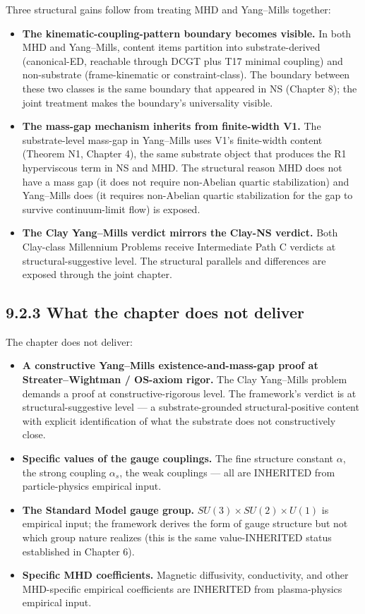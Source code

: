 \documentclass[11pt]{book}
\begin{document}
Three structural gains follow from treating MHD and Yang–Mills together:

\begin{itemize}
\item \textbf{The kinematic-coupling-pattern boundary becomes visible.} In both MHD and Yang–Mills, content items partition into substrate-derived (canonical-ED, reachable through DCGT plus T17 minimal coupling) and non-substrate (frame-kinematic or constraint-class). The boundary between these two classes is the same boundary that appeared in NS (Chapter 8); the joint treatment makes the boundary's universality visible.
\item \textbf{The mass-gap mechanism inherits from finite-width V1.} The substrate-level mass-gap in Yang–Mills uses V1's finite-width content (Theorem N1, Chapter 4), the same substrate object that produces the R1 hyperviscous term in NS and MHD. The structural reason MHD does not have a mass gap (it does not require non-Abelian quartic stabilization) and Yang–Mills does (it requires non-Abelian quartic stabilization for the gap to survive continuum-limit flow) is exposed.
\item \textbf{The Clay Yang–Mills verdict mirrors the Clay-NS verdict.} Both Clay-class Millennium Problems receive Intermediate Path C verdicts at structural-suggestive level. The structural parallels and differences are exposed through the joint chapter.
\end{itemize}

\subsection{9.2.3 What the chapter does not deliver}

The chapter does not deliver:

\begin{itemize}
\item \textbf{A constructive Yang–Mills existence-and-mass-gap proof at Streater–Wightman / OS-axiom rigor.} The Clay Yang–Mills problem demands a proof at constructive-rigorous level. The framework's verdict is at structural-suggestive level — a substrate-grounded structural-positive content with explicit identification of what the substrate does not constructively close.
\item \textbf{Specific values of the gauge couplings.} The fine structure constant $\alpha$, the strong coupling $\alpha_s$, the weak couplings — all are INHERITED from particle-physics empirical input.
\item \textbf{The Standard Model gauge group.} $SU(3) \times SU(2) \times U(1)$ is empirical input; the framework derives the form of gauge structure but not which group nature realizes (this is the same value-INHERITED status established in Chapter 6).
\item \textbf{Specific MHD coefficients.} Magnetic diffusivity, conductivity, and other MHD-specific empirical coefficients are INHERITED from plasma-physics empirical input.
\end{itemize}
\end{document}
